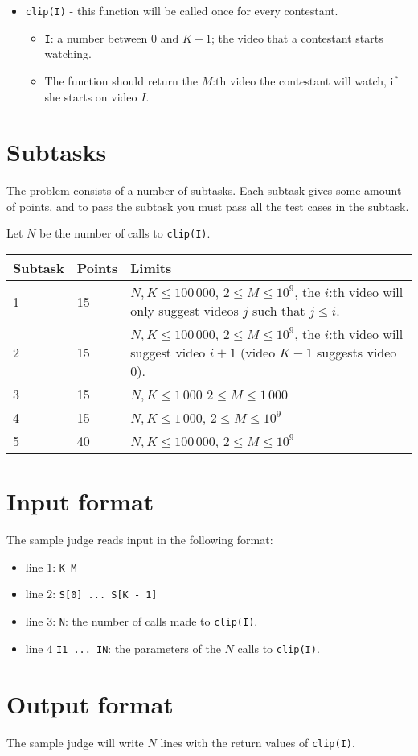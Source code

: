 \begin{itemize}
  \item \texttt{clip(I)} - this function will be called once for every contestant.
  \begin{itemize}
    \item \texttt{I}: a number between $0$ and $K - 1$; the video that a contestant starts watching.
		\item The function should return the $M$:th video the contestant will watch, if she starts on video $I$.
  \end{itemize}
\end{itemize}

\section*{Subtasks}
The problem consists of a number of subtasks. Each subtask gives some amount of points, and to pass
the subtask you must pass all the test cases in the subtask.

Let $N$ be the number of calls to \texttt{clip(I)}.

\begin{tabular}{|l|l|p{7cm}|}
  \hline
  \textbf{Subtask} & \textbf{Points} & \textbf{Limits} \\ \hline
  1 & 15 & $N, K \le 100\,000$, $2 \le M \le 10^9$, the $i$:th video will only suggest videos $j$ such that $j \le i$. \\ \hline
  2 & 15 & $N, K \le 100\,000$, $2 \le M \le 10^9$, the $i$:th video will suggest video $i + 1$ (video $K - 1$ suggests video 0). \\ \hline
  3 & 15 & $N, K \le 1\,000$ $2 \le M \le 1\,000$ \\ \hline
  4 & 15 & $N, K \le 1\,000$, $2 \le M \le 10^9$ \\ \hline
  5 & 40 & $N, K \le 100\,000$, $2 \le M \le 10^9$ \\ \hline
\end{tabular}

\section*{Input format}
The sample judge reads input in the following format:

\begin{itemize}
  \item line $1$: \texttt{K M}
  \item line $2$: \texttt{S[0] ... S[K - 1]}
  \item line $3$: \texttt{N}: the number of calls made to \texttt{clip(I)}.
  \item line $4$ \texttt{I1 ... IN}: the parameters of the $N$ calls to \texttt{clip(I)}.
\end{itemize}

\section*{Output format}
The sample judge will write $N$ lines with the return values of \texttt{clip(I)}.

